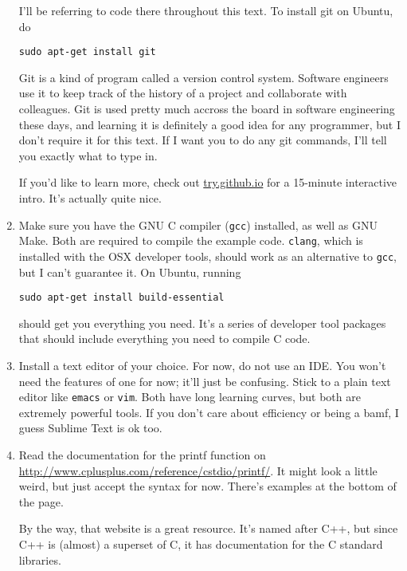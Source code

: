 \documentclass[ebook,11pt,oneside,openany]{memoir}
\begin{document}
\begin{enumerate}
I'll be referring to code there throughout this text. To install git on Ubuntu, do

\begin{verbatim}
sudo apt-get install git
\end{verbatim}

Git is a kind of program called a version control system. Software engineers use it to keep track of the history of a project and collaborate with colleagues. Git is used pretty much accross the board in software engineering these days, and learning it is definitely a good idea for any programmer, but I don't require it for this text. If I want you to do any git commands, I'll tell you exactly what to type in.

If you'd like to learn more, check out \url{try.github.io} for a 15-minute interactive intro. It's actually quite nice.

\item Make sure you have the GNU C compiler (\texttt{gcc}) installed, as well as GNU Make. Both are required to compile the example code. \texttt{clang}, which is installed with the OSX developer tools, should work as an alternative to \texttt{gcc}, but I can't guarantee it. On Ubuntu, running 

\begin{verbatim}
sudo apt-get install build-essential
\end{verbatim}

should get you everything you need. It's a series of developer tool packages that should include everything you need to compile C code.

\item Install a text editor of your choice. For now, do not use an IDE. You won't need the features of one for now; it'll just be confusing. Stick to a plain text editor like \texttt{emacs} or \texttt{vim}. Both have long learning curves, but both are extremely powerful tools. If you don't care about efficiency or being a bamf, I guess Sublime Text is ok too.

\item Read the documentation for the printf function on \url{http://www.cplusplus.com/reference/cstdio/printf/}. It might look a little weird, but just accept the syntax for now. There's examples at the bottom of the page.

By the way, that website is a great resource. It's named after C++, but since C++ is (almost) a superset of C, it has documentation for the C standard libraries.

\end{enumerate}
\end{document}
